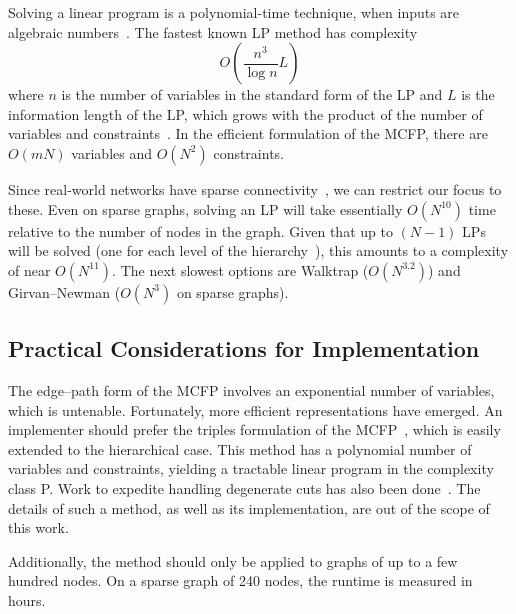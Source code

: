 Solving a linear program is a polynomial-time technique, when inputs are algebraic numbers~\cite{adler1992polynomial}. The fastest known LP method has complexity $$O\left(\frac{n^3}{\log n}L\right)$$ where $n$ is the number of variables in the standard form of the LP and $L$ is the information length of the LP, which grows with the product of the number of variables and constraints~\cite{anstreicher1999linear}. In the efficient  formulation of the MCFP, there are $O(mN)$ variables and $O(N^2)$ constraints. 

Since real-world networks have sparse connectivity~\cite{chakrabarti2006graph}, we can restrict our focus to these. Even on sparse graphs, solving an LP will take essentially $O(N^{10})$ time relative to the number of nodes in the graph. Given that up to $(N-1)$ LPs will be solved (one for each level of the hierarchy~\cite{nace2003some}), this amounts to a complexity of near $O(N^{11})$. The next slowest options are Walktrap ($O(N^{3.2})$) and Girvan--Newman ($O(N^3)$ on sparse graphs). 

\subsection{Practical Considerations for Implementation}
The edge--path form of the MCFP involves an exponential number of variables, which is untenable. Fortunately, more efficient representations have emerged. An implementer should prefer the triples formulation of the MCFP~\cite{dong2015compact}, which is easily extended to the hierarchical case. This method has a polynomial number of variables and constraints, yielding a tractable linear program in the complexity class P\@. Work to expedite handling degenerate cuts has also been done~\cite{danna2012practical}. The details of such a method, as well as its implementation, are out of the scope of this work.

Additionally, the method should only be applied to graphs of up to a few hundred nodes. On a sparse graph of 240 nodes, the runtime is measured in hours.

